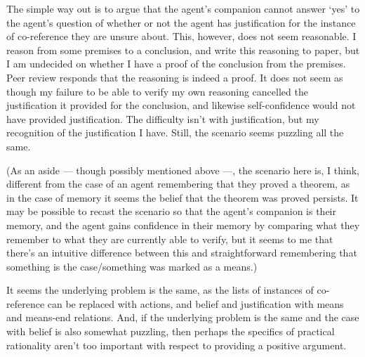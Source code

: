 \documentclass[10pt]{article}
\begin{document}
The simple way out is to argue that the agent's companion cannot answer `yes' to the agent's question of whether or not the agent has justification for the instance of co-reference they are unsure about.
This, however, does not seem reasonable.
I reason from some premises to a conclusion, and write this reasoning to paper, but I am undecided on whether I have a proof of the conclusion from the premises.
Peer review responds that the reasoning is indeed a proof.
It does not seem as though my failure to be able to verify my own reasoning cancelled the justification it provided for the conclusion, and likewise self-confidence would not have provided justification.
The difficulty isn't with justification, but my recognition of the justification I have.
Still, the scenario seems puzzling all the same.

(As an aside --- though possibly mentioned above ---, the scenario here is, I think, different from the case of an agent remembering that they proved a theorem, as in the case of memory it seems the belief that the theorem was proved persists.
It may be possible to recast the scenario so that the agent's companion is their memory, and the agent gains confidence in their memory by comparing what they remember to what they are currently able to verify, but it seems to me that there's an intuitive difference between this and straightforward remembering that something is the case/something was marked as a means.)

It seems the underlying problem is the same, as the lists of instances of co-reference can be replaced with actions, and belief and justification with means and means-end relations.
And, if the underlying problem is the same and the case with belief is also somewhat puzzling, then perhaps the specifics of practical rationality aren't too important with respect to providing a positive argument.

\newpage

\printbibliography
\end{document}
